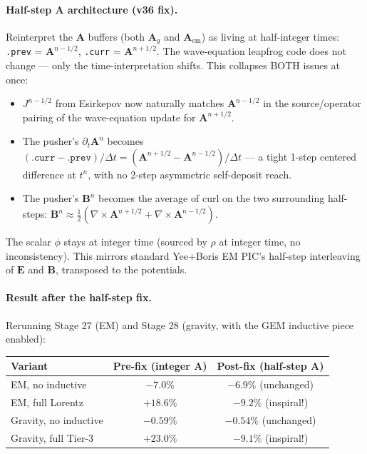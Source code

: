 \documentclass[11pt,a4paper]{article}
\newcommand{\vv}[1]{\mathbf{#1}}
\begin{document}
\paragraph{Half-step $\vv{A}$ architecture (v36 fix).}  Reinterpret the
$\vv{A}$ buffers (both $\vv{A}_g$ and $\vv{A}_{\mathrm{em}}$) as living
at half-integer times: \texttt{.prev} = $\vv{A}^{n-1/2}$, \texttt{.curr}
= $\vv{A}^{n+1/2}$.  The wave-equation leapfrog code does not change ---
only the time-interpretation shifts.  This collapses BOTH issues at
once:
\begin{itemize}
  \item $J^{n-1/2}$ from Esirkepov now naturally matches $\vv{A}^{n-1/2}$
    in the source/operator pairing of the wave-equation update for
    $\vv{A}^{n+1/2}$.
  \item The pusher's $\partial_t\vv{A}^n$ becomes
    $(\texttt{.curr} - \texttt{.prev})/\Delta t = (\vv{A}^{n+1/2} -
    \vv{A}^{n-1/2})/\Delta t$ --- a tight 1-step centered difference
    at $t^n$, with no 2-step asymmetric self-deposit reach.
  \item The pusher's $\vv{B}^n$ becomes the average of curl on the two
    surrounding half-steps: $\vv{B}^n \approx \tfrac{1}{2}(\nabla\!\times\!
    \vv{A}^{n+1/2} + \nabla\!\times\!\vv{A}^{n-1/2})$.
\end{itemize}
The scalar $\phi$ stays at integer time (sourced by $\rho$ at integer
time, no inconsistency).  This mirrors standard Yee$+$Boris EM PIC's
half-step interleaving of $\vv{E}$ and $\vv{B}$, transposed to the
potentials.

\paragraph{Result after the half-step fix.}  Rerunning Stage 27 (EM)
and Stage 28 (gravity, with the GEM inductive piece enabled):

\begin{center}
\begin{tabular}{@{}lcc@{}}
\toprule
\textbf{Variant} & \textbf{Pre-fix (integer $\vv{A}$)} & \textbf{Post-fix (half-step $\vv{A}$)} \\
\midrule
EM, no inductive            & $-7.0\%$    & $-6.9\%$  \quad (unchanged) \\
EM, full Lorentz            & $+18.6\%$   & $\mathbf{-9.2\%}$  \quad (inspiral!) \\
Gravity, no inductive       & $-0.59\%$   & $-0.54\%$ \quad (unchanged) \\
Gravity, full Tier-3        & $+23.0\%$   & $\mathbf{-9.1\%}$  \quad (inspiral!) \\
\bottomrule
\end{tabular}
\end{center}
\end{document}
